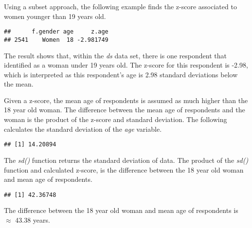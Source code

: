 \documentclass[]{article}
\newenvironment{Shaded}{\begin{snugshade}}{\end{snugshade}}
\newcommand{\KeywordTok}[1]{\textcolor[rgb]{0.13,0.29,0.53}{\textbf{#1}}}
\newcommand{\DataTypeTok}[1]{\textcolor[rgb]{0.13,0.29,0.53}{#1}}
\newcommand{\DecValTok}[1]{\textcolor[rgb]{0.00,0.00,0.81}{#1}}
\newcommand{\FloatTok}[1]{\textcolor[rgb]{0.00,0.00,0.81}{#1}}
\newcommand{\StringTok}[1]{\textcolor[rgb]{0.31,0.60,0.02}{#1}}
\newcommand{\OtherTok}[1]{\textcolor[rgb]{0.56,0.35,0.01}{#1}}
\newcommand{\OperatorTok}[1]{\textcolor[rgb]{0.81,0.36,0.00}{\textbf{#1}}}
\newcommand{\NormalTok}[1]{#1}
\begin{document}
Using a subset approach, the following example finds the z-score
associated to women younger than 19 years old.

\begin{Shaded}
\end{Shaded}

\begin{verbatim}
##      f.gender age     z.age
## 2541    Women  18 -2.981749
\end{verbatim}

The result shows that, within the \emph{ds} data set, there is one
respondent that identified as a woman under 19 years old. The z-score
for this respondent is -2.98, which is interpreted as this respondent's
age is 2.98 standard deviations below the mean.

Given a z-score, the mean age of respondents is assumed as much higher
than the 18 year old woman. The difference between the mean age of
respondents and the woman is the product of the z-score and standard
deviation. The following calculates the standard deviation of the
\emph{age} variable.

\begin{Shaded}
\end{Shaded}

\begin{verbatim}
## [1] 14.20894
\end{verbatim}

The \emph{sd()} function returns the standard deviation of data. The
product of the \emph{sd()} function and calculated z-score, is the
difference between the 18 year old woman and mean age of respondents.

\begin{Shaded}
\end{Shaded}

\begin{verbatim}
## [1] 42.36748
\end{verbatim}

The difference between the 18 year old woman and mean age of respondents
is \(\approx\) 43.38 years.
\end{document}
